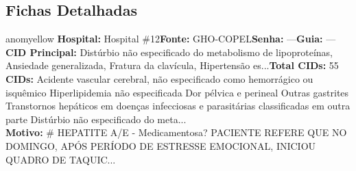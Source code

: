 \documentclass[a4paper,10pt]{article}
\begin{document}
\subsection{Fichas Detalhadas}
\begin{anomalycard}[Interna\c{c}\~{a}o \#705 | Pac. \#822 | MODERADO (z=2.43) | LOS: 6d | 25/02/2026\,$\to$\,03/03/2026]{anomyellow}
\textbf{Hospital:} Hospital \#12\quad \textbf{Fonte:} GHO-COPEL\quad \textbf{Senha:} ---\quad \textbf{Guia:} ---\\

\textbf{CID Principal:} {\small Distúrbio não especificado do metabolismo de lipoproteínas, Ansiedade generalizada, Fratura da clavícula, Hipertensão es...}\quad\textbf{Total CIDs:} 55\\

\textbf{CIDs:} {\scriptsize Acidente vascular cerebral, não especificado como hemorrágico ou isquêmico \textbar{} Hiperlipidemia não especificada \textbar{} Dor pélvica e perineal \textbar{} Outras gastrites \textbar{} Transtornos hepáticos em doenças infecciosas e parasitárias classificadas em outra parte \textbar{} Distúrbio não especificado do meta...}\\

\textbf{Motivo:} {\scriptsize \# HEPATITE A/E  - Medicamentosa?  PACIENTE REFERE QUE NO DOMINGO, APÓS PERÍODO DE ESTRESSE EMOCIONAL, INICIOU QUADRO DE TAQUIC...}\\

\end{anomalycard}
\end{document}
